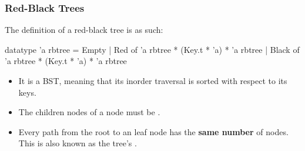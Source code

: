 \documentclass[aspectratio=169, handout]{beamer}
\begin{document}
\begin{frame}[fragile]
  \frametitle{Red-Black Trees}

  The definition of a red-black tree is as such:

  \begin{codeblock}
    datatype 'a rbtree =
        Empty
      | Red of 'a rbtree * (Key.t * 'a) * 'a rbtree
      | Black of 'a rbtree * (Key.t * 'a) * 'a rbtree
  \end{codeblock}

  \pause
  \vspace{\fill}


  \pause
  \vspace{\fill}

  \begin{itemize}
    \item It is a BST, meaning that its inorder traversal is sorted with
    respect to its keys. \pause
    \item The children nodes of a  node must be . \pause
    \item Every path from the root to an  leaf node has the
    \textbf{same number} of  nodes. This is also known as the
    tree's .
  \end{itemize}
\end{frame}
\end{document}
